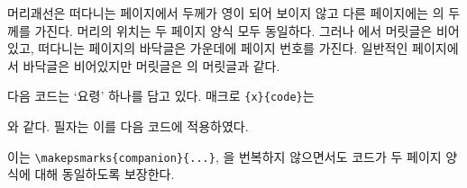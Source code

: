 머리괘선은 떠다니는 페이지에서 두께가 영이 되어 보이지
않고 다른
페이지에는 \cmd{\normalrulethickness}의 두께를 가진다.
머리의 위치는 두 페이지 양식 모두 동일하다.
그러나 에서 머릿글은 비어있고,
떠다니는 페이지의 바닥글은 가운데에 페이지 번호를 가진다.
일반적인 페이지에서 바닥글은 비어있지만
머릿글은 의 머릿글과
같다.

다음 코드는 `요령' 하나를 담고 있다.
매크로 \cmd{\makepsmarks}\verb|{x}{code}|는
\begin{lcode}
\newcommand{\Xpshook}{code}
\end{lcode}
와 같다.
필자는 이를 다음 코드에 적용하였다.
\begin{lcode}
\end{lcode}
이는
\verb?\makepsmarks{companion}{...}?,
을 번복하지 않으면서도 코드가 두 페이지 양식에 대해 동일하도록 보장한다.


